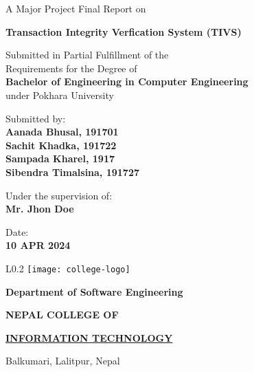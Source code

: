 \documentclass[12pt, a4paper]{report}
\begin{document}
\begin{titlepage}
	\begin{center}
	
	\large%
	A Major Project Final Report on 
	
	\huge %
	\textbf{Transaction Integrity Verfication System (TIVS)}

	\vfill
	
	\large %
	Submitted in Partial Fulfillment of the \\ 
	Requirements for the Degree of \\ 
	\textbf {Bachelor of Engineering in Computer Engineering} \\
	under Pokhara University
	
	\vfill
	
	Submitted by: \\ 
	\textbf {Aanada Bhusal, 191701} \\
	\textbf {Sachit Khadka, 191722} \\
	\textbf {Sampada Kharel, 1917} \\
	\textbf {Sibendra Timalsina, 191727} \\
	
	
	\vfill
	
	Under the supervision of: \\
	\textbf {Mr. Jhon Doe}
	
	\vfill
	
	Date: \\
	\textbf {10 APR 2024}
	
	\vfill
	
	\end{center}
	
	\begin{wrapfigure}{L}{0.2\textwidth}
	\centering
	\texttt{[image: college-logo]}
	\end{wrapfigure}
	
	\selectfont
	
	\textbf {Department of Software Engineering}  
	
	\Large %
	\textbf {NEPAL COLLEGE OF} 
	
	\LARGE %
	\textbf {\underline {INFORMATION TECHNOLOGY} }
	
	\small %
	Balkumari, Lalitpur, Nepal
	
	
\end{titlepage}
\end{document}
